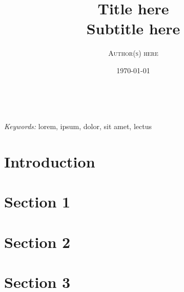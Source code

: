 \documentclass[a4paper, 11pt]{article} %
\title{
	\textbf{Title here}
	\\\vspace{1mm}
	\large Subtitle here
}
\author{\textsc{Author(s) here} %
} %
\date{\today} %
\makeatletter
\renewcommand{\maketitle}{ %
\begin{center} %
{\LARGE\@title} %

\vspace{50pt} %

{\large\@author} %
\\\@date %

\vspace{40pt} %
\end{center}
}
\makeatother
\begin{document}
\maketitle %



\begin{abstract}

\blindtext

\end{abstract}

\hspace*{3,6mm}\textit{Keywords:} lorem, ipsum, dolor, sit amet, lectus %

\vspace{30pt}


\section{Introduction}

\blindtext


\section{Section 1}

\Blindtext


\section{Section 2}

\Blindtext


\section{Section 3}
\end{document}
